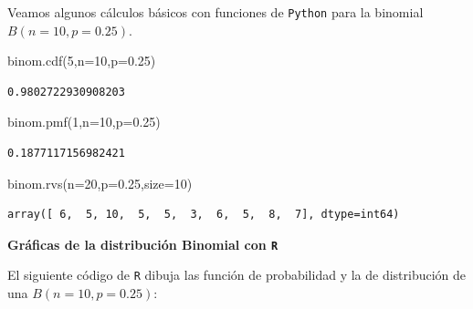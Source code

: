 \documentclass[
  letterpaper,
  DIV=11,
  numbers=noendperiod]{scrreprt}
\newenvironment{Shaded}{\begin{snugshade}}{\end{snugshade}}
\newcommand{\DecValTok}[1]{\textcolor[rgb]{0.68,0.00,0.00}{#1}}
\newcommand{\FloatTok}[1]{\textcolor[rgb]{0.68,0.00,0.00}{#1}}
\newcommand{\NormalTok}[1]{\textcolor[rgb]{0.00,0.23,0.31}{#1}}
\newcommand{\OperatorTok}[1]{\textcolor[rgb]{0.37,0.37,0.37}{#1}}
\begin{document}
Veamos algunos cálculos básicos con funciones de \texttt{Python} para la
binomial \(B(n=10,p=0.25)\).

\begin{Shaded}
\begin{Highlighting}[]
\NormalTok{binom.cdf(}\DecValTok{5}\NormalTok{,n}\OperatorTok{=}\DecValTok{10}\NormalTok{,p}\OperatorTok{=}\FloatTok{0.25}\NormalTok{)}
\end{Highlighting}
\end{Shaded}

\begin{verbatim}
0.9802722930908203
\end{verbatim}

\begin{Shaded}
\begin{Highlighting}[]
\NormalTok{binom.pmf(}\DecValTok{1}\NormalTok{,n}\OperatorTok{=}\DecValTok{10}\NormalTok{,p}\OperatorTok{=}\FloatTok{0.25}\NormalTok{)}
\end{Highlighting}
\end{Shaded}

\begin{verbatim}
0.1877117156982421
\end{verbatim}

\begin{Shaded}
\begin{Highlighting}[]
\NormalTok{binom.rvs(n}\OperatorTok{=}\DecValTok{20}\NormalTok{,p}\OperatorTok{=}\FloatTok{0.25}\NormalTok{,size}\OperatorTok{=}\DecValTok{10}\NormalTok{)}
\end{Highlighting}
\end{Shaded}

\begin{verbatim}
array([ 6,  5, 10,  5,  5,  3,  6,  5,  8,  7], dtype=int64)
\end{verbatim}

\textbf{Gráficas de la distribución Binomial con \texttt{R}}

El siguiente código de \texttt{R} dibuja las función de probabilidad y
la de distribución de una \(B(n=10,p=0.25)\):
\end{document}
